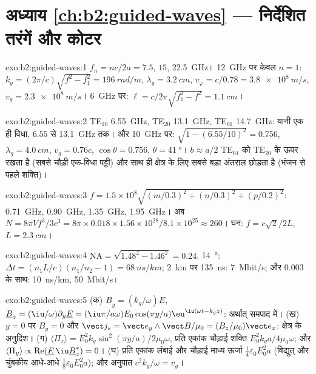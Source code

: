 \section*{अध्याय \ref{ch:b2:guided-waves} --- निर्देशित तरंगें और कोटर}

\begin{solution}{exo:b2:guided-waves:1}
$f_n = nc/2a = 7.5$, $15$, \qty{22.5}{GHz}। \qty{12}{GHz} पर केवल $n = 1$: $k_g =
(2\pi/c)\sqrt{f^2 - f_1^2} = \qty{196}{rad/m}$, $\lambda_g = \qty{3.2}{cm}$, $v_\varphi = c/0.78
= \qty{3.8e8}{m/s}$, $v_g = \qty{2.3e8}{m/s}$। \qty{6}{GHz} पर: $\ell = c/2\pi\sqrt{f_1^2 -
f^2} = \qty{1.1}{cm}$।
\end{solution}

\begin{solution}{exo:b2:guided-waves:2}
TE$_{10}$ \qty{6.55}{GHz}, TE$_{20}$ \qty{13.1}{GHz}, TE$_{01}$ \qty{14.7}{GHz}: यानी एक ही
विधा, $6.55$ से \qty{13.1}{GHz} तक। और \qty{10}{GHz} पर: $\sqrt{1 - (6.55/10)^2} =
0.756$, $\lambda_g = \qty{4.0}{cm}$, $v_g = 0.76c$, $\cos\theta = 0.756$, $\theta = \qty{41}{\degree}$।
$b \approx a/2$ TE$_{01}$ को TE$_{20}$ के ऊपर रखता है (सबसे चौड़ी एक-विधा पट्टी)
और साथ ही क्षेत्र के लिए सबसे बड़ा अंतराल छोड़ता है (भंजन से पहले शक्ति)।
\end{solution}

\begin{solution}{exo:b2:guided-waves:3}
$f = 1.5 \times 10^8\sqrt{(m/0.3)^2 + (n/0.3)^2 + (p/0.2)^2}$: \qty{0.71}{GHz}, \qty{0.90}{GHz},
\qty{1.35}{GHz}, \qty{1.95}{GHz}। अब $N = 8\pi Vf^3/3c^3 = 8\pi \times 0.018 \times 1.56 \times 10^{28}/
8.1 \times 10^{25} \approx 260$। घन: $f = c\sqrt2/2L$, $L = \qty{2.3}{cm}$।
\end{solution}

\begin{solution}{exo:b2:guided-waves:4}
$\mathrm{NA} = \sqrt{1.48^2 - 1.46^2} = 0.24$, \qty{14}{\degree}; $\Delta t = (n_1L/c)(n_1/n_2
- 1) = \qty{68}{ns/km}$; \qty{2}{km} पर \qty{135}{ns}: \qty{7}{Mbit/s}; और $0.003$ के साथ:
\qty{10}{ns/km}, \qty{50}{Mbit/s}।
\end{solution}

\begin{solution}{exo:b2:guided-waves:5}
(क) $\underline B_y = (k_g/\omega)\underline E$, $\underline B_z = (\iu/\omega)\partial_y\underline E = (\iu\pi/a\omega)
E_0\cos(\pi y/a)\eu^{\iu(\omega t - k_gz)}$: अर्थात् समपाद में। (ख) $y = 0$ पर $B_y = 0$ और
$\vect j_s = \vect e_y\wedge\vect B/\mu_0 = (B_z/\mu_0)\vect e_x$: क्षेत्र के अनुदिश। (ग)
$\langle\Pi_z\rangle = E_0^2k_g\sin^2(\pi y/a)/2\mu_0\omega$, प्रति एकांक चौड़ाई शक्ति
$E_0^2k_ga/4\mu_0\omega$; और $\langle\Pi_y\rangle \propto \operatorname{Re}(\underline E\,\iu\underline B_z^*)
= 0$। (घ) प्रति एकांक लंबाई और चौड़ाई माध्य ऊर्जा $\tfrac14\varepsilon_0E_0^2a$ (विद्युत्
और चुंबकीय आधे-आधे $\tfrac18\varepsilon_0E_0^2a$); और अनुपात $c^2k_g/\omega = v_g$।
\end{solution}

